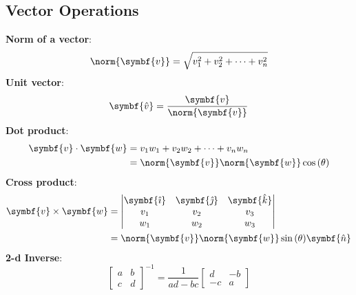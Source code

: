 \documentclass{article}
\begin{document}
\begin{multicols*}{2}
    \section*{Vector Operations}
    \textbf{Norm of a vector}:
    \begin{equation*}
        \norm{\symbf{v}} = \sqrt{v_1^2 + v_2^2+\cdots+v_n^2}
    \end{equation*}
    \textbf{Unit vector}:
    \begin{equation*}
        \symbf{\hat{v}} = \frac{\symbf{v}}{\norm{\symbf{v}}}
    \end{equation*}
    \textbf{Dot product}:
    \begin{align*}
        \symbf{v}\cdot\symbf{w} & = v_1 w_1 + v_2 w_2 + \cdots + v_n w_n                            \\
                                    & = \norm{\symbf{v}} \norm{\symbf{w}} \cos{\left(\theta\right)}
    \end{align*}
    \textbf{Cross product}:
    \begin{align*}
        \symbf{v}\times\symbf{w} & =
        \begin{vmatrix}
            \symbf{\hat{\imath}} & \symbf{\hat{\jmath}} & \symbf{\hat{k}} \\
            v_1                    & v_2                    & v_3               \\
            w_1                    & w_2                    & w_3
        \end{vmatrix} \\
                                     & =
        \norm{\symbf{v}}\norm{\symbf{w}}\sin{\left(\theta\right)}\symbf{\hat{n}}
    \end{align*}
    \textbf{2-d Inverse}:
    \begin{equation*}
        \begin{bmatrix}
            a & b \\ c & d
        \end{bmatrix}^{-1}
        = \frac{1}{ad - bc}
        \begin{bmatrix}
            d & -b \\ -c & a
        \end{bmatrix}
    \end{equation*}

\end{multicols*}
\end{document}
